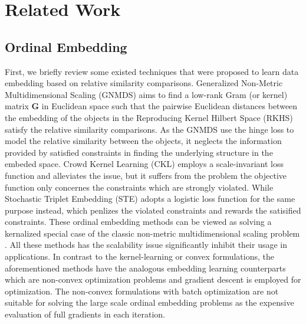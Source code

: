 \documentclass[letterpaper]{article}
\newcommand{\qqxu}[1]{\textcolor[rgb]{0.00,1.00,0.00}{#1}}
\begin{document}
		\section{Related Work}

		\subsection{Ordinal Embedding}

		First, we briefly review some existed techniques that were proposed to learn data embedding based on relative similarity comparisons. Generalized Non-Metric Multidimensional Scaling (GNMDS) \cite{agarwal2007generalized} aims to find a low-rank Gram (or kernel) matrix $\mathbf{G}$ in Euclidean space such that the pairwise Euclidean distances between the embedding of the objects in the Reproducing Kernel Hilbert Space (RKHS) satisfy the relative similarity comparisons. As the GNMDS use the hinge loss to model the relative similarity between the objects, it neglects the information provided by satisfied constraints in finding the underlying structure in the embeded space. Crowd Kernel Learning (CKL) \cite{tamuz2011adaptiive} \qqxu{employs} a scale-invariant loss function and alleviates the issue, but it suffers from the problem the objective function only concernes the constraints which are strongly violated. \qqxu{While} Stochastic Triplet Embedding (STE) \cite{vandermaaten2012stochastic} \qqxu{adopts} a logistic loss function for the same purpose \qqxu{instead}, which penlizes the violated constraints and rewards the satisified constraints. These ordinal embedding methods can be viewed as solving a \qqxu{kernalized} special case of the classic non-metric multidimensional scaling problem \cite{Shepard1962a,Shepard1962b,Kruskal1964a,Kruskal1964b}. All these methods has the scalability issue significantly inhibit their usage in applications. In contrast to the kernel-learning or convex formulations, the aforementioned methods have the analogous embedding learning counterparts which are non-convex optimization problems and gradient descent is employed for optimization. The non-convex formulations with batch optimization are not suitable for solving the large scale ordinal embedding problems as the expensive evaluation of full gradients in each iteration. 
\end{document}
